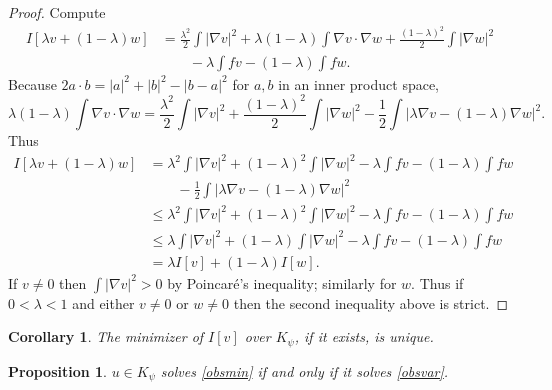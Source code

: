 \documentclass[12pt,final]{amsart}
\newtheorem{prop}[thm]{Proposition}
\newtheorem{cor}[thm]{Corollary}
\theoremstyle{definition}
\newcommand{\grad}{\nabla}
\newcommand{\lam}{\lambda}
\begin{document}
\begin{proof}  Compute
\begin{align*}
I[\lam v + (1-\lam)w] &= \frac{\lam^2}{2} \int |\grad v|^2 + \lam(1-\lam) \int \grad v \cdot \grad w + \frac{(1-\lam)^2}{2} \int |\grad w|^2 \\
    &\qquad - \lam \int f v - (1-\lam) \int f w.\end{align*}
Because $2 a \cdot b = |a|^2 + |b|^2 - |b-a|^2$ for $a,b$ in an inner product space,
    $$\lam(1-\lam) \int \grad v \cdot \grad w = \frac{\lam^2}{2} \int |\grad v|^2 + \frac{(1-\lam)^2}{2} \int |\grad w|^2 - \frac{1}{2} \int |\lam \grad v - (1-\lam)\grad w|^2.$$
Thus
\begin{align*}
I[\lam v + (1-\lam)w] &= \lam^2 \int |\grad v|^2 + (1-\lam)^2 \int |\grad w|^2  - \lam \int f v - (1-\lam) \int f w \\
    &\qquad - \frac{1}{2} \int |\lam \grad v - (1-\lam)\grad w|^2 \\
    &\le \lam^2 \int |\grad v|^2 + (1-\lam)^2 \int |\grad w|^2  - \lam \int f v - (1-\lam) \int f w \\
    &\le \lam \int |\grad v|^2 + (1-\lam) \int |\grad w|^2  - \lam \int f v - (1-\lam) \int f w \\
    &= \lam I[v] + (1-\lam) I[w].\end{align*}
If $v\ne 0$ then $\int |\grad v|^2>0$ by Poincar\'e's inequality; similarly for $w$.  Thus if $0<\lam<1$ and either $v\ne 0$ or $w\ne 0$ then the second inequality above is strict.\end{proof}

\begin{cor}  The minimizer of $I[v]$ over $K_\psi$, if it exists, is unique.
\end{cor}

\begin{prop}\label{prop:equiv} $u\in K_\psi$ solves \eqref{obsmin} if and only if it solves \eqref{obsvar}.
\end{prop}
\end{document}
